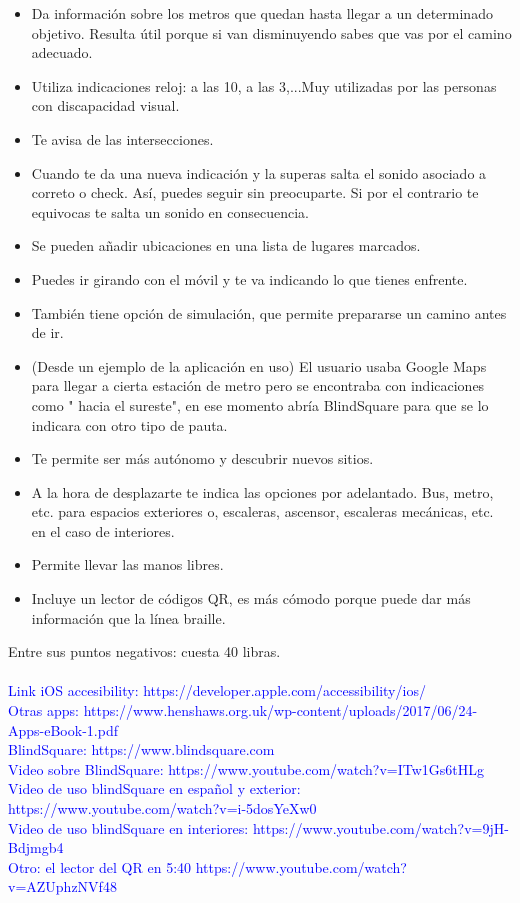 \documentclass{article}
\begin{document}
	\begin{itemize}
		\item Da información sobre los metros que quedan hasta llegar a un determinado objetivo. Resulta útil porque si van disminuyendo sabes que vas por el camino adecuado.
		\item Utiliza indicaciones reloj: a las 10, a las 3,...Muy utilizadas por las personas con discapacidad visual.
		\item Te avisa de las intersecciones. 
		\item Cuando te da una nueva indicación y la superas salta el sonido asociado a correto o check. Así, puedes seguir sin preocuparte. Si por el contrario te equivocas te salta un sonido en consecuencia.
		\item Se pueden añadir ubicaciones en una lista de lugares marcados.
		\item Puedes ir girando con el móvil y te va indicando lo que tienes enfrente. 
		\item También tiene opción de simulación, que permite prepararse un camino antes de ir.
		\item (Desde un ejemplo de la aplicación en uso) El usuario usaba Google Maps para llegar a cierta estación de metro pero se encontraba con indicaciones como " hacia el sureste", en ese momento abría BlindSquare para que se lo indicara con otro tipo de pauta.
		\item Te permite ser más autónomo y descubrir nuevos sitios.
		\item A la hora de desplazarte te indica las opciones por adelantado. Bus, metro, etc. para espacios exteriores o, escaleras, ascensor, escaleras mecánicas, etc. en el caso de interiores.
		\item Permite llevar las manos libres.
		\item Incluye un lector de códigos QR, es más cómodo porque puede dar más información que la línea braille.
	\end{itemize}

	Entre sus puntos negativos: cuesta 40 libras.
	\\
	\\
	\textcolor{blue}{Link iOS accesibility: 	https://developer.apple.com/accessibility/ios/
	\\
	Otras apps: https://www.henshaws.org.uk/wp-content/uploads/2017/06/24-Apps-eBook-1.pdf
	\\
	BlindSquare: https://www.blindsquare.com
	\\
	Video sobre BlindSquare: https://www.youtube.com/watch?v=ITw1Gs6tHLg
	\\
	Video de uso blindSquare en español y exterior: https://www.youtube.com/watch?v=i-5dosYeXw0
	\\
	Video de uso blindSquare en interiores: https://www.youtube.com/watch?v=9jH-Bdjmgb4
	\\
	Otro: el lector del QR en 5:40
	https://www.youtube.com/watch?v=AZUphzNVf48
	}
	
\end{document}
